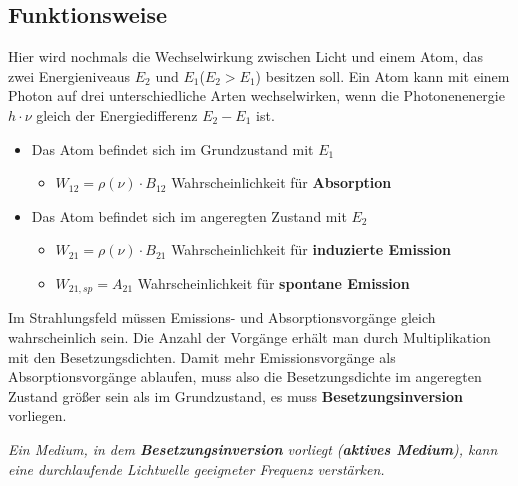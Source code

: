 \documentclass[12pt,a4paper,ngerman]{article}
\begin{document}
\subsection{Funktionsweise}
Hier wird nochmals die Wechselwirkung zwischen Licht und einem Atom, das zwei Energieniveaus $E_2$ und $E_1$($E_2 > E_1$) besitzen soll. Ein Atom kann mit einem Photon auf drei unterschiedliche Arten wechselwirken, wenn die Photonenenergie $h \cdot \nu$ gleich der Energiedifferenz $E_2 - E_1$ ist.
\begin{itemize}
\item Das Atom befindet sich im Grundzustand mit $E_1$ \\ 
\begin{itemize}
\item $W_{12} = \rho(\nu)\cdot B_{12}$   Wahrscheinlichkeit für \textbf{Absorption}
\end{itemize}
\item Das Atom befindet sich im angeregten Zustand mit $E_2$ \\
\begin{itemize}
\item $W_{21} = \rho(\nu)\cdot B_{21}$   Wahrscheinlichkeit für \textbf{induzierte Emission}
\item $W_{21,sp} = A_{21}$   Wahrscheinlichkeit für \textbf{spontane Emission}
\end{itemize}
\end{itemize}
Im Strahlungsfeld müssen Emissions- und Absorptionsvorgänge gleich wahrscheinlich sein. Die Anzahl der Vorgänge erhält man durch Multiplikation mit den Besetzungsdichten. Damit mehr Emissionsvorgänge als Absorptionsvorgänge ablaufen, muss also die Besetzungsdichte im angeregten Zustand größer sein als im Grundzustand, es muss \textbf{Besetzungsinversion} vorliegen.

\begin{center}
\textit{Ein Medium, in dem \textbf{Besetzungsinversion} vorliegt (\textbf{aktives Medium}), kann eine durchlaufende  Lichtwelle geeigneter Frequenz verstärken.}
\end{center}
\end{document}
